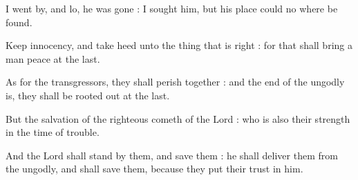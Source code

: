 I went by, and lo, he was gone : I sought him, but his place could no where be found.\par
{}Keep innocency, and take heed unto the thing that is right : for that shall bring a man peace at the last.\par
{}As for the transgressors, they shall perish together : and the end of the ungodly is, they shall be rooted out at the last.\par
{}But the salvation of the righteous cometh of the Lord : who is also their strength in the time of trouble.\par
{}And the Lord shall stand by them, and save them : he shall deliver them from the ungodly, and shall save them, because they put their trust in him.\par




